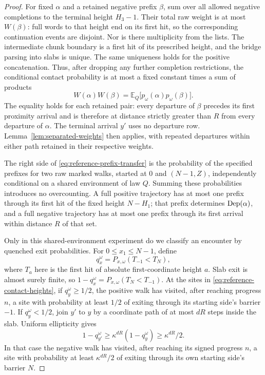 \begin{proof}
For fixed \(\alpha\) and a retained negative prefix \(\beta\), sum over
all allowed negative completions to the terminal height \(H_3-1\).
Their total raw weight is at most \(W(\beta)\): full words to that height
end on its first hit, so the corresponding continuation events are
disjoint.  Nor is there multiplicity from the lists.  The intermediate
chunk boundary is a first hit of its prescribed height, and the bridge
parsing into slabs is unique.  The same uniqueness holds for the positive
concatenation.  Thus, after dropping any further completion restrictions,
the conditional contact probability is at most a fixed constant times a
sum of products
\begin{equation}
 W(\alpha)W(\beta)
 =\mathbb E_Q\bigl[p_\omega(\alpha)p_\omega(\beta)\bigr].
 \label{eq:reference-prefix-transfer}
\end{equation}
The equality holds for each retained pair: every departure of \(\beta\)
precedes its first proximity arrival and is therefore at distance strictly
greater than \(R\) from every departure of \(\alpha\).  The terminal
arrival \(y'\) uses no departure row.  Lemma~\ref{lem:separated-weights}
then applies, with repeated departures within either path retained in
their respective weights.

The right side of \eqref{eq:reference-prefix-transfer} is the probability
of the specified prefixes for two raw marked walks, started at \(0\) and
\((N-1,Z)\), independently conditional on a shared environment of law
\(Q\).  Summing these probabilities introduces no overcounting.  A full
positive trajectory has at most one prefix through its first hit of the
fixed height \(N-H_1\); that prefix determines \(\operatorname{Dep}(\alpha)\), and a
full negative trajectory has at most one prefix through its first arrival
within distance \(R\) of that set.

Only in this shared-environment experiment do we classify an encounter by
quenched exit probabilities.  For \(0\le x_1\le N-1\), define
\[
 q_x^\omega=P_{x,\omega}(T_{-1}<T_N),
\]
where \(T_a\) here is the first hit of absolute first-coordinate height
\(a\).  Slab exit is almost surely finite, so
\(1-q_x^\omega=P_{x,\omega}(T_N<T_{-1})\).  At the sites in
\eqref{eq:reference-contact-heights}, if \(q_y^\omega\ge1/2\), the
positive walk has visited, after reaching progress \(n\), a site with
probability at least \(1/2\) of exiting through its starting side's
barrier \(-1\).  If \(q_y^\omega<1/2\), join \(y'\) to \(y\) by a
coordinate path of at most \(dR\) steps inside the slab.  Uniform
ellipticity gives
\[
 1-q_{y'}^\omega
 \ge\kappa^{dR}(1-q_y^\omega)
 \ge\kappa^{dR}/2.
\]
In that case the negative walk has visited, after reaching its signed
progress \(n\), a site with probability at least \(\kappa^{dR}/2\) of
exiting through its own starting side's barrier \(N\).


\end{proof}

